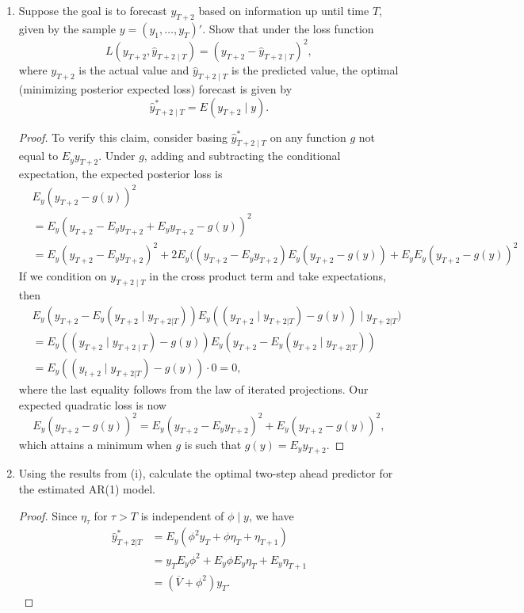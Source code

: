 \documentclass[oneside,reqno]{amsart}
\theoremstyle{definition}
\begin{document}
\begin{enumerate}
\item
Suppose the goal is to forecast $y_{T+2}$ based on information up until time
$T$, given by the sample $y = (y_1,\dotsc,y_T)'$. Show that under the loss function
\begin{equation}
	L(y_{T+2}, \hat y_{T+2 \mid T}) = (y_{T+2} - \hat y_{T+2 \mid T})^2,
\end{equation}
where $y_{T+2}$ is the actual value and $\hat y_{T+2 \mid T}$ is the predicted value, the optimal (minimizing posterior expected loss) forecast is given by
\begin{equation}
	\hat y_{T+2\mid T}^* = E(y_{T+2} \mid y).
\end{equation}

\begin{proof}
To verify this claim, consider basing $\hat y_{T+2\mid T}^*$ on any function $g$ not equal to $E_y y_{T+2}$. Under $g$, adding and subtracting the conditional expectation, the expected posterior loss is
\begin{align*}
	& E_y (y_{T+2} - g(y))^2 \\
	&= E_y (y_{T+2} - E_y y_{T+2}  + E_y y_{T+2} - g(y))^2  \\
	&= E_y (y_{T+2} - E_y y_{T+2})^2 + 2 E_y ((y_{T+2} - E_y y_{T+2}) E_y (y_{T+2}  - g(y)) + E_y E_y (y_{T+2} - g(y))^2
\end{align*}
If we condition on $y_{T+2\mid T}$ in the cross product term and take expectations, then
\begin{align*}
	& E_y (y_{T+2} - E_y (y_{T+2} \mid y_{T+2 | T})) E_y ((y_{T+2} \mid y_{T+2 | T}) - g(y)) \mid y_{T+2 | T}) \\
	&= E_y ((y_{T+2} \mid y_{T+2 \mid T}) - g(y)) E_y (y_{T+2} - E_y (y_{T+2} \mid y_{T+2 | T})) \\
	&=E_y ((y_{t+2} \mid y_{T+2 | T}) - g(y)) \cdot 0 = 0,
\end{align*}
where the last equality follows from the law of iterated projections. Our expected quadratic loss is now 
\[
	E_y (y_{T+2} - g(y))^2 = E_y (y_{T+2} -  E_y y_{T+2} )^2 + E_y (y_{T+2} - g(y))^2,
\]
which attains a minimum when $g$ is such that $g(y) = E_y y_{T+2}$.
\end{proof}

\item
Using the results from (i), calculate the optimal two-step ahead predictor
for the estimated AR(1) model.

\begin{proof}
Since $\eta_\tau$ for $\tau >  T$ is independent of $\phi \mid y$, we have 
\begin{align*}
	\hat y_{T+2| T}^* &= E_y (\phi^2y_T + \phi \eta_T + \eta_{T+1}) \\
	&=y_T E_y\phi^2  + E_y \phi E_y \eta_T + E_y \eta_{T+1} \\
	&= (\overline V + \phi^2) y_T.
\end{align*}
\end{proof}
\end{enumerate}
\end{document}

